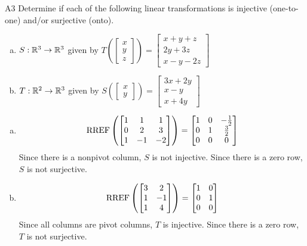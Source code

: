 \begin{problem}{A3}
Determine if each of the following linear transformations is injective (one-to-one) and/or surjective (onto).
\begin{enumerate}[(a)]
\item $S: \mathbb{R}^3 \rightarrow \mathbb{R}^3$ given by $T\left(\begin{bmatrix} x \\ y \\ z  \end{bmatrix} \right) = \begin{bmatrix} x+y+z \\ 2y+3z \\ x-y-2z \end{bmatrix} $
\item $T: \mathbb{R}^2 \rightarrow \mathbb{R}^3$ given by $S\left(\begin{bmatrix} x \\ y  \end{bmatrix} \right) = \begin{bmatrix} 3x+2y \\ x-y \\ x+4y \end{bmatrix} $
\end{enumerate}
\end{problem}
\begin{solution}
\begin{enumerate}[(a)]
\item $$\operatorname{RREF}\left( \begin{bmatrix} 1 &  1 & 1 \\ 0  & 2 & 3 \\ 1  & -1 & -2 \end{bmatrix} \right) = \begin{bmatrix} 1 &  0 & -\frac{1}{2} \\ 0  & 1 & \frac{3}{2} \\ 0& 0 & 0  \end{bmatrix}$$
Since there is a nonpivot column, $S$ is not injective.  Since there is a zero row, $S$ is not surjective.
\item $$\operatorname{RREF} \left( \begin{bmatrix} 3 & 2 \\ 1 & -1 \\ 1 & 4 \end{bmatrix} \right) = \begin{bmatrix} 1 & 0 \\ 0 & 1 \\ 0 & 0 \end{bmatrix}$$
Since all columns are pivot columns, $T$ is injective.  Since there is a zero row, $T$ is not surjective.
\end{enumerate}
\end{solution}



